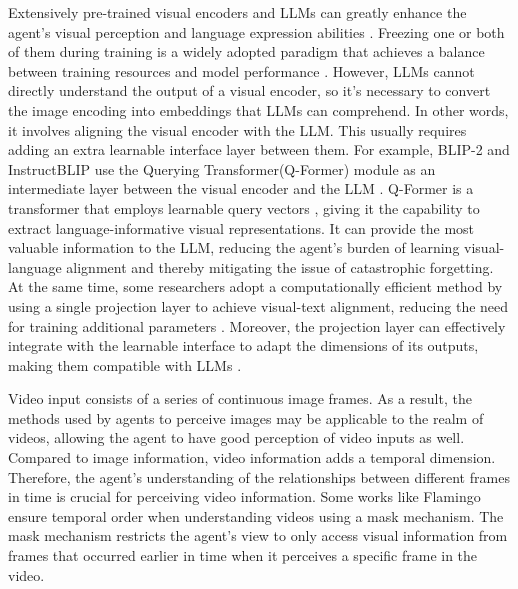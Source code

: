 Extensively pre-trained visual encoders and LLMs can greatly enhance the agent's visual perception and language expression abilities \cite{DBLP:journals/corr/abs-2302-14045,DBLP:journals/corr/abs-2306-14824}. Freezing one or both of them during training is a widely adopted paradigm that achieves a balance between training resources and model performance \cite{DBLP:conf/icml/0008LSH23}. 
However, LLMs cannot directly understand the output of a visual encoder, so it's necessary to convert the image encoding into embeddings that LLMs can comprehend. In other words, it involves aligning the visual encoder with the LLM. 
This usually requires adding an extra learnable interface layer between them. For example, BLIP-2 \cite{DBLP:conf/icml/0008LSH23} and InstructBLIP \cite{DBLP:journals/corr/abs-2305-06500} use the Querying Transformer(Q-Former) module as an intermediate layer between the visual encoder and the LLM \cite{DBLP:journals/corr/abs-2305-06500}. Q-Former is a transformer that employs learnable query vectors \cite{DBLP:journals/corr/abs-2305-04790}, giving it the capability to extract language-informative visual representations. 
It can provide the most valuable information to the LLM, reducing the agent's burden of learning visual-language alignment and thereby mitigating the issue of catastrophic forgetting. At the same time, some researchers adopt a computationally efficient method by using a single projection layer to achieve visual-text alignment, reducing the need for training additional parameters \cite{zhu2023minigpt, DBLP:journals/corr/abs-2305-16355,DBLP:journals/corr/abs-2306-14824}. Moreover, the projection layer can effectively integrate with the learnable interface to adapt the dimensions of its outputs, making them compatible with LLMs \cite{DBLP:journals/corr/abs-2305-04160,DBLP:journals/corr/abs-2306-02858,DBLP:journals/corr/abs-2306-09093,DBLP:journals/corr/abs-2306-05424}.

%
Video input consists of a series of continuous image frames. As a result, the methods used by agents to perceive images \cite{DBLP:conf/icml/0008LSH23} may be applicable to the realm of videos, allowing the agent to have good perception of video inputs as well. Compared to image information, video information adds a temporal dimension. Therefore, the agent's understanding of the relationships between different frames in time is crucial for perceiving video information. Some works like Flamingo \cite{DBLP:conf/nips/AlayracDLMBHLMM22,DBLP:journals/corr/abs-2304-03373} ensure temporal order when understanding videos using a mask mechanism. The mask mechanism restricts the agent's view to only access visual information from frames that occurred earlier in time when it perceives a specific frame in the video.

